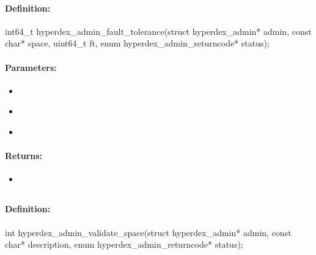 \paragraph{Definition:}
\begin{ccode}
int64_t hyperdex_admin_fault_tolerance(struct hyperdex_admin* admin,
        const char* space,
        uint64_t ft,
        enum hyperdex_admin_returncode* status);
\end{ccode}

\paragraph{Parameters:}
\begin{itemize}[noitemsep]
\item {}\\

\item {}\\

\item {}\\

\end{itemize}

\paragraph{Returns:}
\begin{itemize}[noitemsep]
\item {}\\

\end{itemize}

\pagebreak
\subsection{}
\label{api:c:validate_space}


\paragraph{Definition:}
\begin{ccode}
int hyperdex_admin_validate_space(struct hyperdex_admin* admin,
        const char* description,
        enum hyperdex_admin_returncode* status);
\end{ccode}

